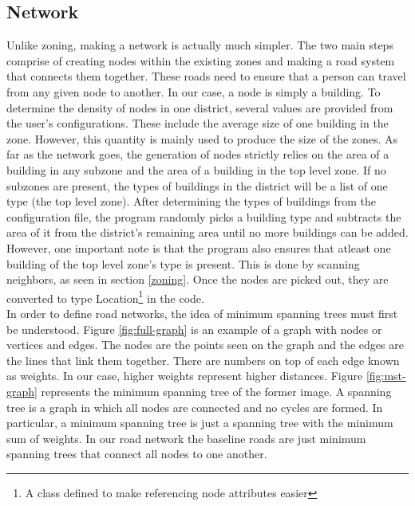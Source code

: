 \documentclass[11pt]{article}
\begin{document}
\begin{multicols}{2}
    \subsection{Network} \label{network}
    
    \quad Unlike zoning, making a network is actually much simpler. The two main steps comprise of creating nodes within the existing zones and making a road system that connects them together. These roads need to ensure that a person can travel from any given node to another. In our case, a node is simply a building. To determine the density of nodes in one district, several values are provided from the user's configurations. These include the average size of one building in the zone. However, this quantity is mainly used to produce the size of the zones. As far as the network goes, the generation of nodes strictly relies on the area of a building in any subzone and the area of a building in the top level zone. If no subzones are present, the types of buildings in the district will be a list of one type (the top level zone). After determining the types of buildings from the configuration file, the program randomly picks a building type and subtracts the area of it from the district's remaining area until no more buildings can be added. However, one important note is that the program also ensures that atleast one building of the top level zone's type is present. This is done by scanning neighbors, as seen in section \ref{zoning}. Once the nodes are picked out, they are converted to type Location\footnote{A class defined to make referencing node attributes easier} in the code.\\

    \quad In order to define road networks, the idea of minimum spanning trees must first be understood. Figure \ref{fig:full-graph} is an example of a graph with nodes or vertices and edges. The nodes are the points seen on the graph and the edges are the lines that link them together. There are numbers on top of each edge known as weights. In our case, higher weights represent higher distances. Figure \ref{fig:mst-graph} represents the minimum spanning tree of the former image. A spanning tree is a graph in which all nodes are connected and no cycles are formed. In particular, a minimum spanning tree is just a spanning tree with the minimum sum of weights. In our road network the baseline roads are just minimum spanning trees that connect all nodes to one another.


\end{multicols}
\end{document}
